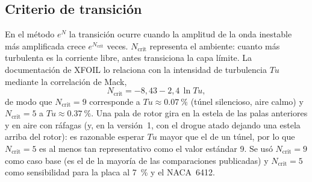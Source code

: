 \subsection{Criterio de transición}
En el método $e^N$ la transición ocurre cuando la amplitud de la onda inestable más
amplificada crece $e^{N_{\text{crit}}}$ veces. $N_{\text{crit}}$ representa el ambiente:
cuanto más turbulenta es la corriente libre, antes transiciona la capa límite. La
documentación de XFOIL lo relaciona con la intensidad de turbulencia $Tu$ mediante la
correlación de Mack,
\begin{equation}
  N_{\text{crit}}=-8{,}43-2{,}4\,\ln Tu ,
  \label{eq:polares-mack}
\end{equation}
de modo que $N_{\text{crit}}=9$ corresponde a $Tu\approx\SI{0.07}{\percent}$ (túnel
silencioso, aire calmo) y $N_{\text{crit}}=5$ a $Tu\approx\SI{0.37}{\percent}$. Una pala de
rotor gira en la estela de las palas anteriores y en aire con ráfagas (y, en la versión~1, con el drogue atado
dejando una estela arriba del rotor): es razonable esperar $Tu$ mayor que el de un túnel, por lo que
$N_{\text{crit}}=5$ es al menos tan representativo como el valor estándar 9. Se usó
$N_{\text{crit}}=9$ como caso base (es el de la mayoría de las comparaciones publicadas) y
$N_{\text{crit}}=5$ como sensibilidad para la placa al \SI{7}{\percent} y el NACA~6412.

